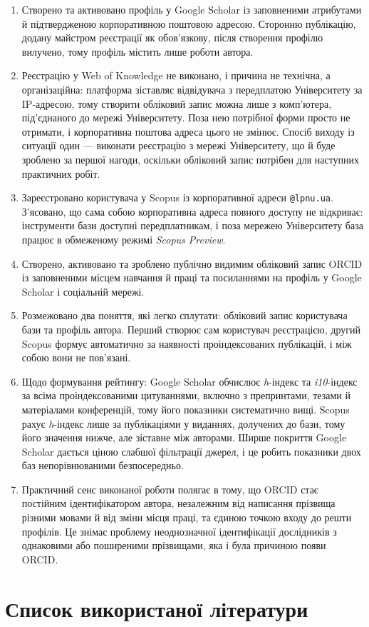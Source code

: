 \documentclass[14pt,a4paper]{extreport}
\begin{document}
\begin{enumerate}[ref=\arabic*]
\item Створено та активовано профіль у Google Scholar із заповненими атрибутами й підтвердженою корпоративною поштовою адресою. Сторонню публікацію, додану майстром реєстрації як обов'язкову, після створення профілю вилучено, тому профіль містить лише роботи автора.

\item\label{concl:wos} Реєстрацію у Web of Knowledge не виконано, і причина не технічна, а організаційна: платформа зіставляє відвідувача з передплатою Університету за IP-адресою, тому створити обліковий запис можна лише з комп'ютера, під'єднаного до мережі Університету. Поза нею потрібної форми просто не отримати, і корпоративна поштова адреса цього не змінює. Спосіб виходу із ситуації один — виконати реєстрацію з мережі Університету, що й буде зроблено за першої нагоди, оскільки обліковий запис потрібен для наступних практичних робіт.

\item Зареєстровано користувача у Scopus із корпоративної адреси \texttt{@lpnu.ua}. З'ясовано, що сама собою корпоративна адреса повного доступу не відкриває: інструменти бази доступні передплатникам, і поза мережею Університету база працює в обмеженому режимі \textit{Scopus Preview}.

\item Створено, активовано та зроблено публічно видимим обліковий запис ORCID із заповненими місцем навчання й праці та посиланнями на профіль у Google Scholar і соціальній мережі.

\item Розмежовано два поняття, які легко сплутати: обліковий запис користувача бази та профіль автора. Перший створює сам користувач реєстрацією, другий Scopus формує автоматично за наявності проіндексованих публікацій, і між собою вони не пов'язані.

\item Щодо формування рейтингу: Google Scholar обчислює \textit{h}-індекс та \textit{i10}-індекс за всіма проіндексованими цитуваннями, включно з препринтами, тезами й матеріалами конференцій, тому його показники систематично вищі. Scopus рахує \textit{h}-індекс лише за публікаціями у виданнях, долучених до бази, тому його значення нижче, але зіставне між авторами. Ширше покриття Google Scholar дається ціною слабшої фільтрації джерел, і це робить показники двох баз непорівнюваними безпосередньо.

\item Практичний сенс виконаної роботи полягає в тому, що ORCID стає постійним ідентифікатором автора, незалежним від написання прізвища різними мовами й від зміни місця праці, та єдиною точкою входу до решти профілів. Це знімає проблему неоднозначної ідентифікації дослідників з однаковими або поширеними прізвищами, яка і була причиною появи ORCID.
\end{enumerate}

\section{Список використаної літератури}

\printbibliography[heading=none]
\end{document}
